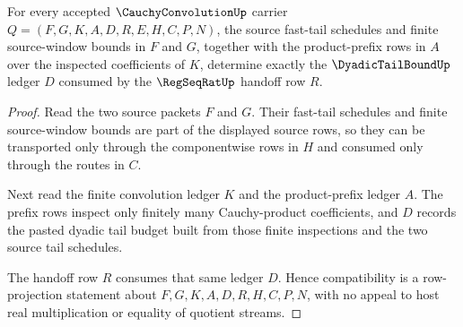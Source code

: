 \begin{theorem}
\label{thm:cauchy-convolution-tail-budget-compatibility}
For every accepted $\CauchyConvolutionUp$ carrier $Q=(F,G,K,A,D,R,E,H,C,P,N)$, the source fast-tail schedules and finite source-window bounds in $F$ and $G$, together with the product-prefix rows in $A$ over the inspected coefficients of $K$, determine exactly the $\DyadicTailBoundUp$ ledger $D$ consumed by the $\RegSeqRatUp$ handoff row $R$.
\end{theorem}
\begin{proof}
Read the two source packets $F$ and $G$. Their fast-tail schedules and finite source-window bounds are part of the displayed source rows, so they can be transported only through the componentwise rows in $H$ and consumed only through the routes in $C$.

Next read the finite convolution ledger $K$ and the product-prefix ledger $A$. The prefix rows inspect only finitely many Cauchy-product coefficients, and $D$ records the pasted dyadic tail budget built from those finite inspections and the two source tail schedules.

The handoff row $R$ consumes that same ledger $D$. Hence compatibility is a row-projection statement about $F,G,K,A,D,R,H,C,P,N$, with no appeal to host real multiplication or equality of quotient streams.
\end{proof}

